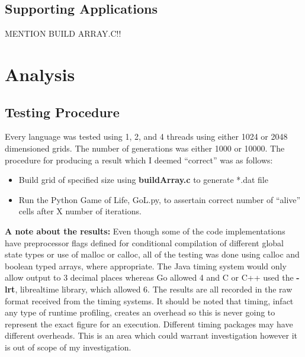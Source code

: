 \documentclass[11pt]{article} %
\begin{document}
\subsection{Supporting Applications}
MENTION BUILD ARRAY.C!!

\section{Analysis}
\subsection{Testing Procedure}
Every language was tested using 1, 2, and 4 threads using either 1024 or 2048 dimensioned grids. The number of generations was either 1000 or 10000. The procedure for producing a result which I deemed ``correct'' was as follows:
\begin{itemize}
\item Build grid of specified size using {\bf buildArray.c} to generate *.dat file
\item Run the Python Game of Life, GoL.py, to assertain correct number of ``alive'' cells after X number of iterations.
\end{itemize}
\begin{mdframed}
{\bf A note about the results:} Even though some of the code implementations have preprocessor flags defined for conditional compilation of different global state types or use of malloc or calloc, all of the testing was done using calloc and boolean typed arrays, where appropriate. The Java timing system would only allow output to 3 decimal places whereas Go allowed 4 and C or C++ used the {\bf -lrt}, librealtime library, which allowed 6. The results are all recorded in the raw format received from the timing systems. It should be noted that timing, infact any type of runtime profiling, creates an overhead so this is never going to represent the exact figure for an execution. Different timing packages may have different overheads. This is an area which could warrant investigation however it is out of scope of my investigation.
\end{mdframed}
\end{document}
